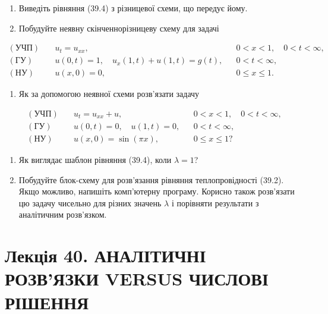 \documentclass[
  ukrainian,
]{article}
\providecommand{\tightlist}{%
  \setlength{\itemsep}{0pt}\setlength{\parskip}{0pt}}
\begin{document}
\begin{enumerate}
\def\labelenumi{\arabic{enumi}.}
\item
  Виведіть рівняння (39.4) з різницевої схеми, що передує йому.
\item
  Побудуйте неявну скінченнорізницеву схему для задачі
\end{enumerate}

\[\begin{aligned}(\text{УЧП})\quad & u_t=u_{xx}, && 0<x<1,\quad 0<t<\infty,\\(\text{ГУ})\quad & u(0,t)=1,\quad u_x(1,t)+u(1,t)=g(t), && 0<t<\infty,\\(\text{НУ})\quad & u(x,0)=0, && 0\le x\le 1.\end{aligned}\]

\begin{enumerate}
\def\labelenumi{\arabic{enumi}.}
\setcounter{enumi}{2}
\tightlist
\item
  Як за допомогою неявної схеми розв'язати задачу
\end{enumerate}

\[\begin{aligned}(\text{УЧП})\quad & u_t=u_{xx}+u, && 0<x<1,\quad 0<t<\infty,\\(\text{ГУ})\quad & u(0,t)=0,\quad u(1,t)=0, && 0<t<\infty,\\(\text{НУ})\quad & u(x,0)=\sin(\pi x), && 0\le x\le 1?\end{aligned}\]

\begin{enumerate}
\def\labelenumi{\arabic{enumi}.}
\setcounter{enumi}{3}
\item
  Як виглядає шаблон рівняння (39.4), коли \(\lambda=1\)?
\item
  Побудуйте блок-схему для розв'язання рівняння теплопровідності (39.2).
  Якщо можливо, напишіть комп'ютерну програму. Корисно також розв'язати
  цю задачу чисельно для різних значень \(\lambda\) і порівняти
  результати з аналітичним розв'язком.
\end{enumerate}

\section{Лекція 40. АНАЛІТИЧНІ РОЗВ'ЯЗКИ VERSUS ЧИСЛОВІ
РІШЕННЯ}\label{ux43bux435ux43aux446ux456ux44f-40.-ux430ux43dux430ux43bux456ux442ux438ux447ux43dux456-ux440ux43eux437ux432ux44fux437ux43aux438-versus-ux447ux438ux441ux43bux43eux432ux456-ux440ux456ux448ux435ux43dux43dux44f}
\end{document}
